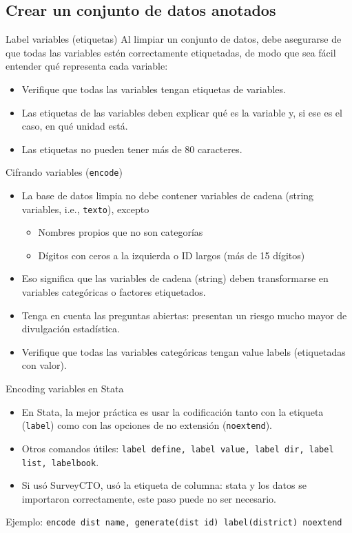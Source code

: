 \documentclass[10pt, aspectratio=169, compress]{beamer}
\begin{document}
\subsection{Crear un conjunto de datos anotados}
\begin{frame}[t]{Label variables (etiquetas)}
	Al limpiar un conjunto de datos, debe asegurarse de que todas las variables estén correctamente etiquetadas, de modo que sea fácil entender qué representa cada variable:
	\begin{itemize}
		\item Verifique que todas las variables tengan etiquetas de variables.
		\item Las etiquetas de las variables deben explicar qué es la variable y, si ese es el caso, en qué unidad está.
		\item Las etiquetas no pueden tener más de 80 caracteres.
	\end{itemize}
\end{frame}
\begin{frame}[t]{Cifrando variables (\texttt{encode})}
	\begin{itemize}
		\item La base de datos limpia no debe contener variables de cadena (string variables, i.e., \texttt{texto}), excepto
		\begin{itemize}
			\item Nombres propios que no son categorías
			\item Dígitos con ceros a la izquierda o ID largos (más de 15 dígitos)
		\end{itemize}
		\item Eso significa que las variables de cadena (string) deben transformarse en variables categóricas o factores etiquetados.
		\item Tenga en cuenta las preguntas abiertas: presentan un riesgo mucho mayor de divulgación estadística.
		\item Verifique que todas las variables categóricas tengan value labels (etiquetadas con valor).
	\end{itemize}
\end{frame}
\begin{frame}[t]{Encoding variables en Stata}
	\begin{itemize}
		\item En Stata, la mejor práctica es usar la codificación tanto con la etiqueta (\texttt{label}) como con las opciones de no extensión (\texttt{noextend}).
		\item Otros comandos útiles: \texttt{label define, label value, label dir, label list, labelbook}.
		\item Si usó SurveyCTO, usó la etiqueta de columna: stata y los datos se importaron correctamente, este paso puede no ser necesario. 
	\end{itemize}

	\begin{center}
		Ejemplo: \texttt{encode dist name, generate(dist id) label(district) noextend}
	\end{center}
\end{frame}
\end{document}
